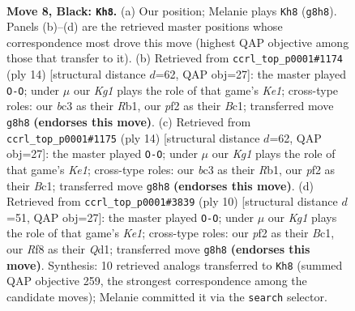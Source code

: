 \documentclass[11pt]{article}
\begin{document}
\begin{figure}[p]\centering
\begin{subfigure}{0.46\textwidth}\centering
\resizebox{\linewidth}{!}{%
\newchessgame
\chessboard[
  setfen={r1b2rk1/ppppqppp/2n1pn2/8/2PP4/2B1PNP1/PP3P1P/R2QKB1R b KQ - 0 8},
  showmover=false,
  pgfstyle=straightmove, color=movearrow, markmove={g8-h8}
]}
\caption{}
\end{subfigure}\hfill
\begin{subfigure}{0.46\textwidth}\centering
\resizebox{\linewidth}{!}{%
\newchessgame
\chessboard[
  setfen={r1bqk1nr/1p3pbp/2np2p1/p1p1p3/2P5/P1N2NP1/1P1PPPBP/1RBQK2R w Kkq - 0 8},
  showmover=false,
  pgfstyle=straightmove, color=movearrow, markmove={e1-g1}
]}
\caption{}
\end{subfigure}
\\[4pt]
\begin{subfigure}{0.46\textwidth}\centering
\resizebox{\linewidth}{!}{%
\newchessgame
\chessboard[
  setfen={r1bqk1nr/1p3pbp/2np2p1/p1p1p3/2P5/P1N2NP1/1P1PPPBP/1RBQK2R w Kkq - 0 8},
  showmover=false,
  pgfstyle=straightmove, color=movearrow, markmove={e1-g1}
]}
\caption{}
\end{subfigure}\hfill
\begin{subfigure}{0.46\textwidth}\centering
\resizebox{\linewidth}{!}{%
\newchessgame
\chessboard[
  setfen={r1bqk1nr/ppp2pbp/2np2p1/4p3/2P5/2N2NP1/PP1PPPBP/R1BQK2R w KQkq - 2 6},
  showmover=false,
  pgfstyle=straightmove, color=movearrow, markmove={e1-g1}
]}
\caption{}
\end{subfigure}
\caption{\textbf{Move 8, Black: \texttt{Kh8}.} (a) Our position; Melanie plays \texttt{Kh8} (\texttt{g8h8}). Panels (b)--(d) are the retrieved master positions whose correspondence most drove this move (highest QAP objective among those that transfer to it). (b) Retrieved from \texttt{ccrl\_top\_p0001\#1174} (ply 14) [structural distance $d$=62, QAP obj=27]: the master played \texttt{O-O}; under $\mu$ our \emph{Kg1} plays the role of that game's \emph{Ke1}; cross-type roles: our \emph{b}c3 as their \emph{R}b1, our \emph{p}f2 as their \emph{B}c1; transferred move \texttt{g8h8} \textbf{(endorses this move)}. (c) Retrieved from \texttt{ccrl\_top\_p0001\#1175} (ply 14) [structural distance $d$=62, QAP obj=27]: the master played \texttt{O-O}; under $\mu$ our \emph{Kg1} plays the role of that game's \emph{Ke1}; cross-type roles: our \emph{b}c3 as their \emph{R}b1, our \emph{p}f2 as their \emph{B}c1; transferred move \texttt{g8h8} \textbf{(endorses this move)}. (d) Retrieved from \texttt{ccrl\_top\_p0001\#3839} (ply 10) [structural distance $d$=51, QAP obj=27]: the master played \texttt{O-O}; under $\mu$ our \emph{Kg1} plays the role of that game's \emph{Ke1}; cross-type roles: our \emph{p}f2 as their \emph{B}c1, our \emph{R}f8 as their \emph{Q}d1; transferred move \texttt{g8h8} \textbf{(endorses this move)}. Synthesis: 10 retrieved analogs transferred to \texttt{Kh8} (summed QAP objective 259, the strongest correspondence among the candidate moves); Melanie committed it via the \texttt{search} selector.}
\label{fig:thought-m15}
\end{figure}
\end{document}
